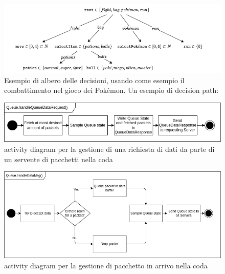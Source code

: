 \documentclass[conference]{IEEEtran}
\begin{document}
\begin{figure}
    \centering
    \includegraphics[width=\textwidth]{figs/decisions.drawio.png}
    \caption{Esempio di albero delle decisioni, usando come esempio il combattimento
    nel gioco dei Pokémon. Un esempio di decision path:\\
    }
    \label{fig:decisions}
\end{figure}
\begin{figure}
    \centering
    \includegraphics[width=\textwidth]{figs/queue_handleQueueDataRequest_activity_diagram.drawio.png}
    \caption{activity diagram per la gestione di una richiesta di dati da parte di un servente di pacchetti nella coda}
    \label{fig:queue_handleQueueDataRequest_activity_diagram}
\end{figure}
\begin{figure}
    \centering
    \includegraphics[width=\textwidth]{figs/queue_handleDataMsg_activity_diagram.drawio.png}
    \caption{activity diagram per la gestione di pacchetto in arrivo nella coda}
    \label{fig:queue_handleDataMsg_activity_diagram}
\end{figure}
\end{document}
